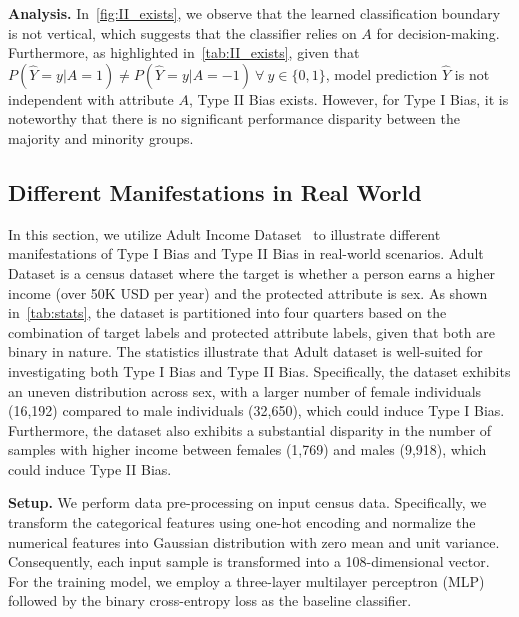 \noindent
\textbf{Analysis.}
In~\cref{fig:II_exists}, we observe that the learned classification boundary is not vertical, which suggests that the classifier relies on $A$ for decision-making.
Furthermore, as highlighted in~\cref{tab:II_exists}, given that $P(\hat{Y}=y|A=1) \neq P(\hat{Y}=y|A=-1)~\forall~y \in \{0,1\}$, model prediction $\hat{Y}$ is not independent with attribute $A$, \ie Type II Bias exists.
However, for Type I Bias, it is noteworthy that there is no significant performance disparity between the majority and minority groups.














\subsection{Different Manifestations in Real World}
In this section, we utilize Adult Income Dataset~\cite{adult_dataset_and_german_dataset} to illustrate different manifestations of Type I Bias and Type II Bias in real-world scenarios. 
Adult Dataset is a census dataset where the target is whether a person earns a higher income (over 50K USD per year) and the protected attribute is sex.
As shown in~\cref{tab:stats}, the dataset is partitioned into four quarters based on the combination of target labels and protected attribute labels, given that both are binary in nature.
The statistics illustrate that Adult dataset is well-suited for investigating both Type I Bias and Type II Bias. 
Specifically, the dataset exhibits an uneven distribution across sex, with a larger number of female individuals (16,192) compared to male individuals (32,650), which could induce Type I Bias.
Furthermore, the dataset also exhibits a substantial disparity in the number of samples with higher income between females (1,769) and males (9,918), which could induce Type II Bias.








\noindent
\textbf{Setup.}
We perform data pre-processing on input census data. 
Specifically, we transform the categorical features using one-hot encoding and normalize the numerical features into Gaussian distribution with zero mean and unit variance.
Consequently, each input sample is transformed into a 108-dimensional vector.
For the training model, we employ a three-layer multilayer perceptron (MLP) followed by the binary cross-entropy loss as the baseline classifier.



